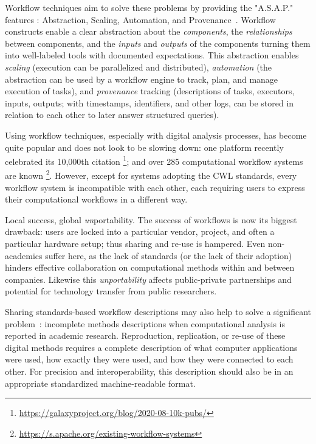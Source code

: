 \documentclass[sigconf,authordraft]{acmart}
\begin{document}
Workflow techniques aim to solve these problems by providing the "A.S.A.P." features : Abstraction, Scaling, Automation, and Provenance~\cite{cuevas-vicenttin_scientific_2012}.  Workflow constructs enable a clear abstraction about the \textit{components}, the \textit{relationships} between components, and the \textit{inputs} and \textit{outputs} of the components turning them into well-labeled tools with documented expectations. This abstraction enables \textit{scaling} (execution can be parallelized and distributed), \textit{automation} (the abstraction can be used by a workflow engine to track, plan, and manage execution of tasks), and \textit{provenance} tracking (descriptions of tasks, executors, inputs, outputs; with timestamps, identifiers, and other logs, can be stored in relation to each other to later answer structured queries).

Using workflow techniques, especially with digital analysis processes, has become quite popular and does not look to be slowing down: one platform recently celebrated its 10,000th citation \footnote{\url{https://galaxyproject.org/blog/2020-08-10k-pubs/}}; and over 285 computational workflow systems are known \footnote{\url{https://s.apache.org/existing-workflow-systems}}. However, except for systems adopting the CWL standards, every workflow system is incompatible with each other, each requiring users to express their computational workflows in a different way.

Local success, global \textit{un}portability. The success of workflows is now its biggest drawback: users are locked into a particular vendor, project, and often a particular hardware setup; thus sharing and re-use is hampered. Even non-academics suffer here, as the lack of standards (or the lack of their adoption) hinders effective collaboration on computational methods within and between companies. Likewise this \textit{unportability} affects public-private partnerships and potential for technology transfer from public researchers.

Sharing standards-based workflow descriptions may also help to solve a significant problem~\cite{ivie_reproducibility_2018, feitelson_repeatability_2015}: incomplete methods descriptions when computational analysis is reported in academic research. Reproduction, replication, or re-use of these digital methods requires a complete description of what computer applications were used, how exactly they were used, and how they were connected to each other. For precision and interoperability, this description should also be in an appropriate standardized machine-readable format.
\end{document}
